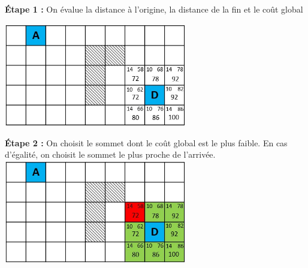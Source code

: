 \begin{multicols}{2}

\begin{center}

\textbf{\'Etape 1 :} On évalue la distance à l'origine, la distance de la fin et le coût global \\
\vfill

\includegraphics[width=8cm]{images/quadri3.jpg}
\end{center}
\begin{center}


\textbf{\'Etape 2 :} On choisit le sommet dont le coût global est le plus faible. En cas d'égalité, on choisit le sommet le plus proche de l'arrivée.
\includegraphics[width=8cm]{images/quadri4.jpg}
\end{center}
\end{multicols}


\newpage


